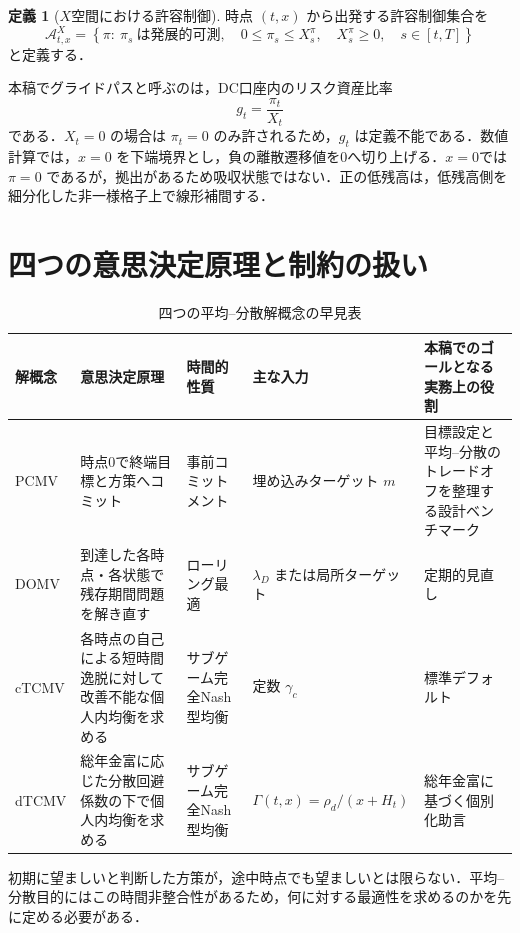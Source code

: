 \documentclass[10pt,a4paper]{article}
\theoremstyle{plain}
\theoremstyle{definition}
\newtheorem{definition}{定義}
\newcommand{\A}{\mathcal{A}}
\begin{document}
\begin{definition}[$X$空間における許容制御]
時点 $(t,x)$ から出発する許容制御集合を
\begin{equation}
  \A^X_{t,x}
  =
  \left\{
  \pi:\ \pi_s\ \text{は発展的可測},\quad
  0\leq\pi_s\leq X_s^\pi,\quad X_s^\pi\geq0,\quad s\in[t,T]
  \right\}
  \label{eq:admissible-X}
\end{equation}
と定義する．
\end{definition}

本稿でグライドパスと呼ぶのは，DC口座内のリスク資産比率
\begin{equation}
  g_t=\frac{\pi_t}{X_t}
  \label{eq:glidepath-def}
\end{equation}
である．$X_t=0$ の場合は $\pi_t=0$ のみ許されるため，$g_t$ は定義不能である．数値計算では，$x=0$ を下端境界とし，負の離散遷移値を0へ切り上げる．$x=0$では $\pi=0$ であるが，拠出があるため吸収状態ではない．正の低残高は，低残高側を細分化した非一様格子上で線形補間する．




\section{四つの意思決定原理と制約の扱い}\label{sec:principles-main}
\begin{table}[htbp]
\centering
\scriptsize
\caption{四つの平均--分散解概念の早見表}
\label{tab:four-concepts-guide}
\begin{tabularx}{\textwidth}{p{16mm}p{39mm}p{25mm}p{28mm}X}
\toprule
解概念 & 意思決定原理 & 時間的性質 & 主な入力 & 本稿でのゴールとなる実務上の役割 \\
\midrule
PCMV & 時点0で終端目標と方策へコミット & 事前コミットメント & 埋め込みターゲット $m$ & 目標設定と平均--分散のトレードオフを整理する設計ベンチマーク \\
DOMV & 到達した各時点・各状態で残存期間問題を解き直す & ローリング最適 & $\lambda_D$ または局所ターゲット & 定期的見直し \\
cTCMV & 各時点の自己による短時間逸脱に対して改善不能な個人内均衡を求める & サブゲーム完全Nash型均衡 & 定数 $\gamma_c$ & 標準デフォルト \\
dTCMV & 総年金富に応じた分散回避係数の下で個人内均衡を求める & サブゲーム完全Nash型均衡 & $\Gamma(t,x)=\rho_d/(x+H_t)$ & 総年金富に基づく個別化助言 \\
\bottomrule
\end{tabularx}
\end{table}
初期に望ましいと判断した方策が，途中時点でも望ましいとは限らない．平均--分散目的にはこの時間非整合性があるため，何に対する最適性を求めるのかを先に定める必要がある．
\end{document}
